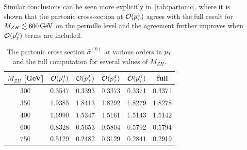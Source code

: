 Similar conclusions can be seen more explicitly in~\autoref{tab:partonic}, where it is shown that the partonic cross-section
at $\mathcal{O}(p_{\scriptscriptstyle T}^4)$ agrees with the full result for
$M_{ZH} \lesssim 600 \,\textrm{GeV}$  on the permille level 
and the agreement further improves when $\mathcal{O}(p_{\scriptscriptstyle T}^6)$ terms are included.
\begin{table}
	\renewcommand{\arraystretch}{1.2}
	\centering
	\begin{tabular}{| c| c | c | c| c| c|} \hline
		\rowcolor{lightgray}  $M_{ZH}$ [GeV]  & $\mathcal{O}(p_{\scriptscriptstyle T}^0)$ & $\mathcal{O}(p_{\scriptscriptstyle T}^2)$ & $\mathcal{O}(p_{\scriptscriptstyle T}^4)$ & $\mathcal{O}(p_{\scriptscriptstyle T}^6)$ & full \\ \hline 
		\cellcolor{lightgray} 300 & 0.3547 & 0.3393 &  0.3373 &0.3371& 0.3371 \\
		\cellcolor{lightgray} 350 & 1.9385 & 1.8413& 1.8292 &1.8279& 1.8278 \\
		\cellcolor{lightgray} 400 & 1.6990 & 1.5347 & 1.5161 &1.5143& 1.5142 \\
		\cellcolor{lightgray} 600 & 0.8328 & 0.5653 & 0.5804 &0.5792&  0.5794 \\ 
		\cellcolor{lightgray} 750 & 0.5129 & 0.2482 & 0.3129 & 0.2841 &  0.2919 \\ \hline
	\end{tabular}
	\caption{The partonic cross section $\hat{\sigma}^{(0)}$ at
		various orders in $p_{\scriptscriptstyle T}$ and the full computation for several values of $M_{ZH}$. \label{tab:partonic}}
\end{table}

